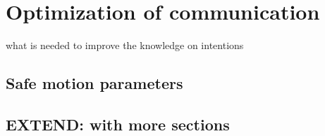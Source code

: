 \chapter{Optimization of communication}
what is needed to improve the knowledge on intentions

\section{Safe motion parameters}

\section{EXTEND: with more sections}
